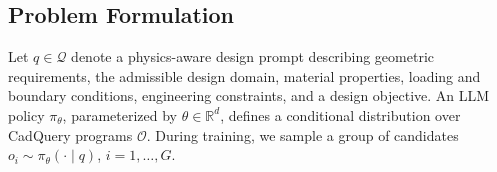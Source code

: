 

\subsection{Problem Formulation} 
\label{sec:problem_formulation}

Let \(q\in\mathcal{Q}\) denote a physics-aware design prompt describing geometric requirements, the admissible design domain, material properties, loading and boundary conditions, engineering constraints, and a design objective. An LLM policy \(\pi_{\theta}\), parameterized by \(\theta\in\mathbb{R}^{d}\), defines a conditional distribution over CadQuery programs \(\mathcal{O}\). During training, we sample a group of candidates
\(o_i\sim\pi_{\theta}(\cdot\mid q)\), \(i=1,\ldots,G\).

